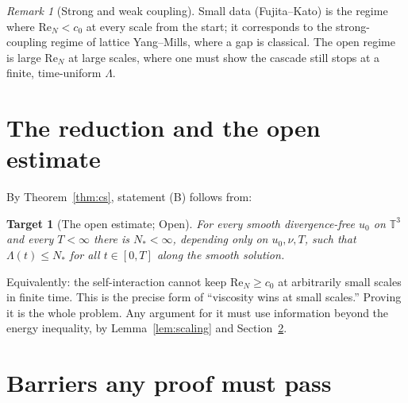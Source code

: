 \documentclass[11pt]{article}
\newtheorem{conjecture}[theorem]{Target}
\theoremstyle{definition}
\theoremstyle{remark}
\newtheorem{remark}[theorem]{Remark}
\newcommand{\T}{\mathbb{T}}
\renewcommand{\Re}{\mathrm{Re}}
\begin{document}
\begin{remark}[Strong and weak coupling]
Small data (Fujita--Kato) is the regime where $\Re_N<c_0$ at every scale
from the start; it corresponds to the strong-coupling regime of lattice
Yang--Mills, where a gap is classical. The open regime is large $\Re_N$ at
large scales, where one must show the cascade still stops at a finite,
time-uniform $\Lambda$.
\end{remark}

\section{The reduction and the open estimate}

By Theorem~\ref{thm:cs}, statement (B) follows from:

\begin{conjecture}[The open estimate; Open]\label{conj:main}
For every smooth divergence-free $u_0$ on $\T^3$ and every $T<\infty$ there
is $N_*<\infty$, depending only on $u_0,\nu,T$, such that $\Lambda(t)\le N_*$
for all $t\in[0,T]$ along the smooth solution.
\end{conjecture}

Equivalently: the self-interaction cannot keep $\Re_N\ge c_0$ at
arbitrarily small scales in finite time. This is the precise form of
``viscosity wins at small scales.'' Proving it is the whole problem. Any
argument for it must use information beyond the energy inequality, by
Lemma~\ref{lem:scaling} and Section~\ref{sec:barriers}.

\section{Barriers any proof must pass}\label{sec:barriers}
\end{document}
